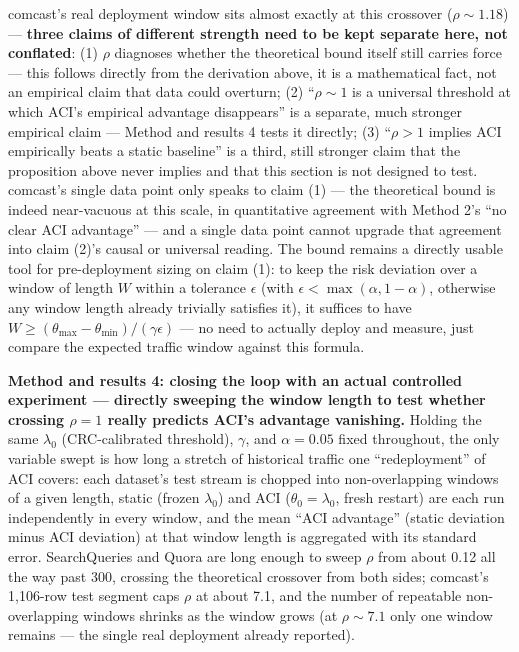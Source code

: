 \documentclass[11pt]{article}
\begin{document}
comcast's real deployment window sits almost exactly at this crossover ($\rho \sim 1.18$) --- \textbf{three claims of different strength need to be kept separate here, not conflated}: (1) $\rho$ diagnoses whether the theoretical bound itself still carries force --- this follows directly from the derivation above, it is a mathematical fact, not an empirical claim that data could overturn; (2) ``$\rho \sim 1$ is a universal threshold at which ACI's empirical advantage disappears'' is a separate, much stronger empirical claim --- Method and results 4 tests it directly; (3) ``$\rho > 1$ implies ACI empirically beats a static baseline'' is a third, still stronger claim that the proposition above never implies and that this section is not designed to test. comcast's single data point only speaks to claim (1) --- the theoretical bound is indeed near-vacuous at this scale, in quantitative agreement with Method 2's ``no clear ACI advantage'' --- and a single data point cannot upgrade that agreement into claim (2)'s causal or universal reading. The bound remains a directly usable tool for pre-deployment sizing on claim (1): to keep the risk deviation over a window of length $W$ within a tolerance $\epsilon$ (with $\epsilon < \max(\alpha,1-\alpha)$, otherwise any window length already trivially satisfies it), it suffices to have $W \ge (\theta_{\max}-\theta_{\min})/(\gamma\epsilon)$ --- no need to actually deploy and measure, just compare the expected traffic window against this formula.

\textbf{Method and results 4: closing the loop with an actual controlled experiment --- directly sweeping the window length to test whether crossing $\rho=1$ really predicts ACI's advantage vanishing.} Holding the same $\lambda_0$ (CRC-calibrated threshold), $\gamma$, and $\alpha=0.05$ fixed throughout, the only variable swept is how long a stretch of historical traffic one ``redeployment'' of ACI covers: each dataset's test stream is chopped into non-overlapping windows of a given length, static (frozen $\lambda_0$) and ACI ($\theta_0=\lambda_0$, fresh restart) are each run independently in every window, and the mean ``ACI advantage'' (static deviation minus ACI deviation) at that window length is aggregated with its standard error. SearchQueries and Quora are long enough to sweep $\rho$ from about 0.12 all the way past 300, crossing the theoretical crossover from both sides; comcast's 1,106-row test segment caps $\rho$ at about 7.1, and the number of repeatable non-overlapping windows shrinks as the window grows (at $\rho \sim 7.1$ only one window remains --- the single real deployment already reported).
\end{document}
